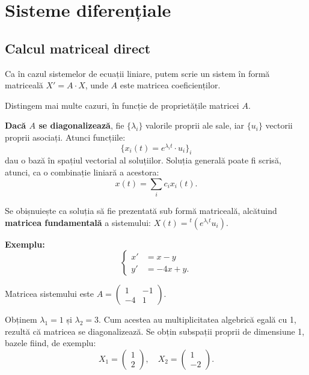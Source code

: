 
\chapter{Sisteme diferențiale}

\section{Calcul matriceal direct}

Ca în cazul sistemelor de ecuații liniare, putem scrie un sistem în formă matriceală $X' = A \cdot X$,
unde $A$ este matricea coeficienților.

Distingem mai multe cazuri, în funcție de proprietățile matricei $A$.

\textbf{Dacă $A$ se diagonalizează}, fie $\{\lambda_i\}$ valorile proprii ale sale,
iar $\{u_i\}$ vectorii proprii asociați. Atunci funcțiile:
\[
  \{ x_i(t) = e^{\lambda_i t} \cdot u_i \}_i
\]
dau o bază în spațiul vectorial al soluțiilor. Soluția generală poate fi scrisă,
atunci, ca o combinație liniară a acestora:
\[
  x(t) = \sum_i c_i x_i(t).
\]

Se obișnuiește ca soluția să fie prezentată sub formă matriceală, alcătuind
\textbf{matricea fundamentală} a sistemului: $X(t) = {}^t (e^{\lambda_i t} u_i)$.

\vspace{0.5cm}

\textbf{Exemplu:}
\[
  \begin{cases}
    x' &= x - y \\
    y' &= -4x + y.
  \end{cases}
\]

Matricea sistemului este $A = \begin{pmatrix} 1 & -1 \\ -4 & 1 \end{pmatrix}$.

Obținem $\lambda_1 = 1$ și $\lambda_2 = 3$. Cum acestea au multiplicitatea algebrică
egală cu 1, rezultă că matricea se diagonalizează. Se obțin subspații proprii de dimensiune
1, bazele fiind, de exemplu:
\[
  X_1 = \begin{pmatrix} 1 \\ 2 \end{pmatrix}, \quad
  X_2 = \begin{pmatrix} 1 \\ -2 \end{pmatrix}.
\]

